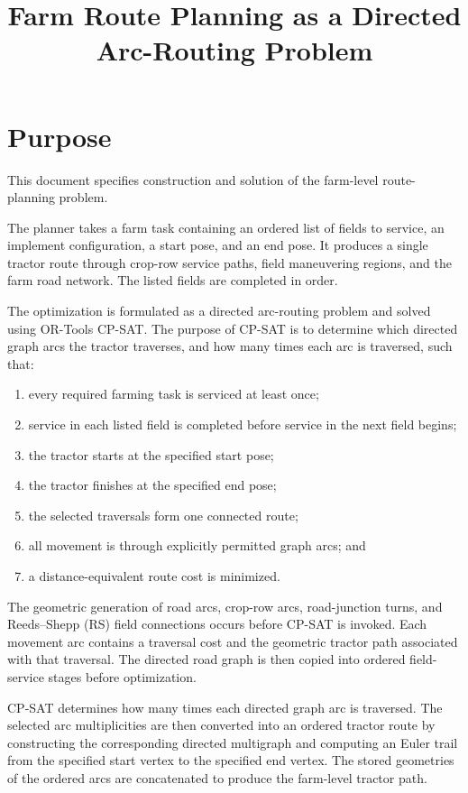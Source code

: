 \documentclass{article}
\title{Farm Route Planning as a Directed Arc-Routing Problem}
\date{}
\begin{document}
\maketitle

\section{Purpose}

This document specifies construction and solution of the farm-level route-planning problem.

The planner takes a farm task containing an ordered list of fields to service, an implement configuration, a start pose, and an end pose. It produces a single tractor route through crop-row service paths, field maneuvering regions, and the farm road network. The listed fields are completed in order.

The optimization is formulated as a directed arc-routing problem and solved using OR-Tools CP-SAT.
The purpose of CP-SAT is to determine which directed graph arcs the tractor traverses, and how many times each arc is traversed, such that:
\begin{enumerate}
\item every required farming task is serviced at least once;
\item service in each listed field is completed before service in the next field begins;
\item the tractor starts at the specified start pose;
\item the tractor finishes at the specified end pose;
\item the selected traversals form one connected route;
\item all movement is through explicitly permitted graph arcs; and
\item a distance-equivalent route cost is minimized.
\end{enumerate}

The geometric generation of road arcs, crop-row arcs, road-junction turns, and Reeds--Shepp (RS) field connections occurs before CP-SAT is invoked. Each movement arc contains a traversal cost and the geometric tractor path associated with that traversal. The directed road graph is then copied into ordered field-service stages before optimization.

CP-SAT determines how many times each directed graph arc is traversed. The selected arc multiplicities are then converted into an ordered tractor route by constructing the corresponding directed multigraph and computing an Euler trail from the specified start vertex to the specified end vertex. The stored geometries of the ordered arcs are concatenated to produce the farm-level tractor path.
\end{document}
